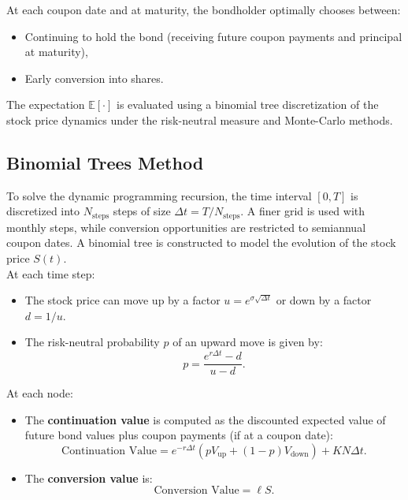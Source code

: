 At each coupon date and at maturity, the bondholder optimally chooses between:
\begin{itemize}
    \item Continuing to hold the bond (receiving future coupon payments and principal at maturity),
    \item Early conversion into shares.
\end{itemize}

\vspace{0.3cm}
\noindent
The expectation $\mathbb{E}[\cdot]$ is evaluated using a binomial tree discretization of the stock price dynamics under the risk-neutral measure and Monte-Carlo methods.

\subsection{Binomial Trees Method}

To solve the dynamic programming recursion, the time interval $[0, T]$ is discretized into $N_{\text{steps}}$ steps of size $\Delta t = T / N_{\text{steps}}$. A finer grid is used with monthly steps, while conversion opportunities are restricted to semiannual coupon dates. A binomial tree is constructed to model the evolution of the stock price $S(t)$. \\ At each time step:
\begin{itemize}
    \item The stock price can move up by a factor $u = e^{\sigma \sqrt{\Delta t}}$ or down by a factor $d = 1/u$.
    \item The risk-neutral probability $p$ of an upward move is given by:
    \begin{equation}
        p = \frac{e^{r \Delta t} - d}{u - d}.
    \end{equation}
\end{itemize}

At each node:
\begin{itemize}
    \item The \textbf{continuation value} is computed as the discounted expected value of future bond values plus coupon payments (if at a coupon date):
    \begin{equation}
        \text{Continuation Value} = e^{-r \Delta t} \left( p V_{\text{up}} + (1 - p) V_{\text{down}} \right) + K N \Delta t.
    \end{equation}
    \item The \textbf{conversion value} is:
    \begin{equation}
        \text{Conversion Value} = \ell S.
    \end{equation}
\end{itemize}

